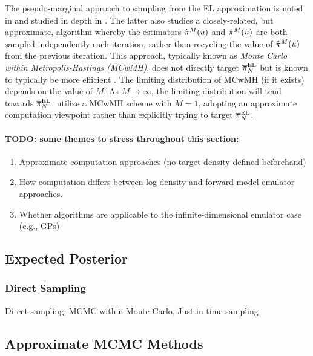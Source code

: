 \documentclass[12pt]{article}
\begin{document}
The pseudo-marginal approach to sampling from the EL approximation is noted in \citep{StuartTeck1} and studied 
in depth in \citep{garegnani2021NoisyMCMC}. The latter also studies a closely-related, but approximate, algorithm
whereby the estimators $\hat{\pi}^M(u)$ and $\hat{\pi}^M(\tilde{u})$ are both sampled independently
each iteration, rather than recycling the value of $\hat{\pi}^M(u)$ from the previous iteration. This approach, 
typically known as \textit{Monte Carlo within Metropolis-Hastings (MCwMH)}, does not directly target $\overline{\pi}_{N}^{\mathrm{EL}}$
but is known to typically be more efficient \citep{noisyMCMC,stabilityNoisyMH,noisyMCSurvey}.
The limiting distribution of MCwMH (if it exists) depends on the value of $M$. As $M \to \infty$, the limiting distribution 
will tend towards $\overline{\pi}_{N}^{\mathrm{EL}}$. \citep{FerEmulation} utilize a MCwMH scheme with $M = 1$, adopting an
approximate computation viewpoint rather than explicitly trying to target $\overline{\pi}_{N}^{\mathrm{EL}}$.



\paragraph{TODO: some themes to stress throughout this section:}
\begin{enumerate}
\item Approximate computation approaches (no target density defined beforehand)
\item How computation differs between log-density and forward model emulator approaches.
\item Whether algorithms are applicable to the infinite-dimensional emulator case (e.g., GPs)
\end{enumerate}

\subsection{Expected Posterior}
\subsubsection{Direct Sampling}
Direct sampling, MCMC within Monte Carlo, Just-in-time sampling

\subsection{Approximate MCMC Methods}
\end{document}
